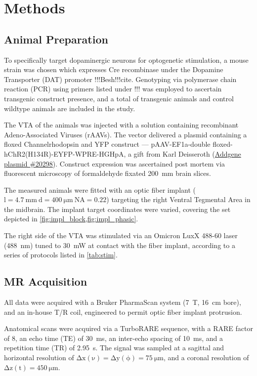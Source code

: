 \section{Methods}

\subsection{Animal Preparation}

To specifically target dopaminergic neurons for optogenetic stimulation, a mouse strain was chosen which expresses Cre recombinase under the Dopamine Transporter (DAT) promoter !!!Besh!!!cite.
Genotyping via polymerase chain reaction (PCR) using primers listed under !!! was employed to ascertain transgenic construct presence, and a total of  transgenic animals and  control wildtype animals are included in the study.

The VTA of the animals was injected with a solution containing recombinant Adeno-Associated Viruses (rAAVs).
The vector delivered a plasmid containing a floxed Channelrhodopsin and YFP construct ---
pAAV-EF1a-double floxed-hChR2(H134R)-EYFP-WPRE-HGHpA, a gift from Karl Deisseroth (\href{https://www.addgene.org/20298/}{Addgene plasmid \#20298}).
Construct expression was ascertained post mortem via fluorescent microscopy of formaldehyde fixated \SI{200}{\milli\metre} brain slices.

The measured animals were fitted with an optic fiber implant ($\mathrm{l=\SI{4.7}{\milli\meter} \ d=\SI{400}{\micro\meter} \ NA=0.22}$) targeting the right Ventral Tegmental Area in the midbrain.
The implant target coordinates were varied, covering the set depicted in \cref{fig:impl_block,fig:impl_phasic}.

The right side of the VTA was stimulated via an Omicron LuxX 488-60 laser (\SI{488}{\nano\meter}) tuned to \SI{30}{\milli\watt} at contact with the fiber implant, according to a series of protocols listed in \cref{tab:stim}.

\subsection{MR Acquisition}

All data were acquired with a Bruker PharmaScan system (\SI{7}{\tesla}, \SI{16}{\centi\meter} bore), and an in-house T/R coil, engineered to permit optic fiber implant protrusion.

Anatomical scans were acquired via a TurboRARE sequence, with a RARE factor of 8, an echo time (TE) of \SI{30}{\milli\second}, an inter-echo spacing of \SI{10}{\milli\second}, and a repetition time (TR) of \SI{2.95}{\second}.
The signal was sampled at a sagittal and horizontal resolution of $\mathrm{\Delta x(\nu)=\Delta y(\phi)=\SI{75}{\micro\meter}}$, and a coronal resolution of $\mathrm{\Delta z(t)=\SI{450}{\micro\meter}}$.

